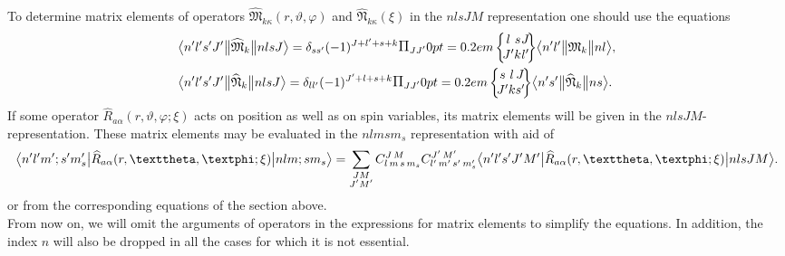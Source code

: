 To determine matrix elements of operators \(\widehat{\mathfrak{M}}_{k \kappa}(r, \vartheta, \varphi)\) and \(\widehat{\mathfrak{N}}_{k \kappa}(\xi)\) in the \(nlsJM\) representation one should use the equations
\begin{align}
& 
\braOketred{ n^{\prime} l^{\prime} s^{\prime} J^{\prime}}{\widehat{\mathfrak{M}}_{k}}{ n l s J}=\delta_{s s^{\prime}}(-1)^{J+l^{\prime}+s+k} \Fact{J J^{\prime}}
\sixj{l}{s}{J}{J^{\prime}}{k}{l^{\prime}}
\braOketred{ n^{\prime} l^{\prime}}{\mathfrak{M}_{k}}{ n l},  \label{eq:13:2:5}\\
& 
\braOketred{ n^{\prime} l^{\prime} s^{\prime} J^{\prime}}{\widehat{\mathfrak{N}}_{k}}{ n l s J}=\delta_{l l^{\prime}}(-1)^{J^{\prime}+l+s+k} \Fact{J J^{\prime}}
\sixj{s}{l}{J}{J^{\prime}}{k}{s^{\prime}}
\braOketred{ n^{\prime} s^{\prime}}{\widehat{\mathfrak{N}}_{k}}{ n s}. \label{eq:13:2:6}
\end{align}
If some operator \(\widehat{R}_{a \alpha}(r, \vartheta, \varphi ; \xi)\) acts on position as well as on spin variables, its matrix elements will be given in the $nlsJM$-representation. These matrix elements may be evaluated in the \(nlmsm_{s}\) representation with aid of
\begin{equation}
\braOket{ n^{\prime} l^{\prime} m^{\prime} ; s^{\prime} m_{s}^{\prime}}{ \widehat{R}_{a \alpha}(r, \vartheta, \varphi ; \xi)}{n l m ; s m_{s}}=\sum_{\substack{J M \\ J^{\prime} M^{\prime}}}
\clebsch{l}{m}{s}{m_{s}}{J}{M}
\clebsch{l^{\prime}}{m^{\prime}}{s^{\prime}}{m_{s}^{\prime}}{J^{\prime}}{M^{\prime}}
\braOket{n^{\prime} l^{\prime} s^{\prime} J^{\prime} M^{\prime}}{\widehat{R}_{a \alpha}(r, \vartheta, \varphi ; \xi)}{n l s J M}. \label{eq:13:2:7}
\end{equation}
or from the corresponding equations of the section above.\\
From now on, we will omit the arguments of operators in the expressions for matrix elements to simplify the equations. In addition, the index \(n\) will also be dropped in all the cases for which it is not essential.

